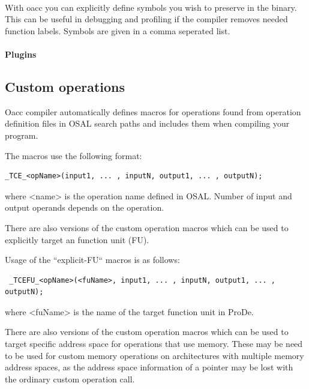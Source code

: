 \documentclass[a4paper,twoside]{tceusermanual}
\begin{document}
 \\

With oacc you can explicitly define symbols you wish to preserve in the
binary. This can be useful in debugging and profiling if the compiler removes
needed function labels.
Symbols are given in a comma seperated list.


\paragraph{Plugins}

\subsection{Custom operations}
\label{sec:oaccCustOp}

Oacc compiler automatically defines macros for operations found from
operation definition files in OSAL search paths and includes them
when compiling your program.

The macros use the following format:

\begin{verbatim}
_TCE_<opName>(input1, ... , inputN, output1, ... , outputN);
\end{verbatim}
where <name> is the operation name defined in OSAL. Number of input and
output operands depends on the operation.

There are also versions of the custom operation macros which can be used
to explicitly target an function unit (FU). 

Usage of the ``explicit-FU`` macros is as follows:

\begin{verbatim}
 _TCEFU_<opName>(<fuName>, input1, ... , inputN, output1, ... , outputN);
\end{verbatim}

where <fuName> is the name of the target function unit in ProDe. 

There are also versions of the custom operation macros which can be
used to target specific address space for operations that use memory.
These may be need to be used for custom memory operations on architectures with
multiple memory address spaces, as the address space information of a pointer
may be lost with the ordinary custom operation call.
\end{document}
